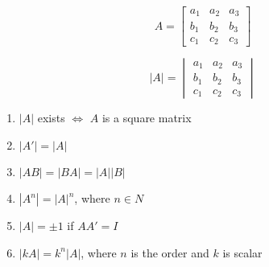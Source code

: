 

\[
A = 
\begin{bmatrix}
a_1 & a_2 & a_3\\
b_1 & b_2 & b_3\\
c_1 & c_2 & c_3
\end{bmatrix}
\]

\[
|A| = 
\begin{vmatrix}
a_1 & a_2 & a_3\\
b_1 & b_2 & b_3\\
c_1 & c_2 & c_3
\end{vmatrix}
\]

\begin{enumerate}%
\item $|A|$ exists $\iff$ $A$ is a square matrix
\item $|A'| = |A|$
\item $|AB|=|BA|=|A||B|$
\item $|A^n| = |A|^n$, where $n\in N$
\item $|A|=\pm 1$ if $AA'=I$
\item $|kA| = k^n|A|$, where $n$ is the order and $k$ is scalar
\end{enumerate}